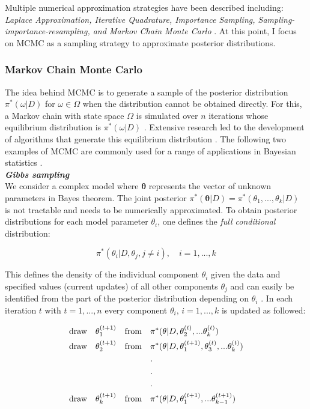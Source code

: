 Multiple numerical approximation strategies have been described including: \emph{Laplace Approximation, Iterative Quadrature, Importance Sampling, Sampling-importance-resampling, and Markov Chain Monte Carlo} \citep{Bernardo2000}. At this point, I focus on \gls{MCMC} \citep{Metropolis1953, Hastings1970} as a sampling strategy to approximate posterior distributions.

\subsubsection{Markov Chain Monte Carlo}

The idea behind MCMC is to generate a sample of the posterior distribution $\pi^*(\omega|D)$ for $\omega\in\Omega$ when the distribution cannot be obtained directly. For this, a Markov chain with state space $\Omega$ is simulated over $n$ iterations whose equilibrium distribution is $\pi^*(\omega|D)$ \citep{Bernardo2000}. Extensive research led to the development of algorithms that generate this equilibrium distribution \citep{Casella1992, Gelfand1990, Greyer1992, Besag1993, Gelman1992}.
The following two examples of MCMC are commonly used for a range of applications in Bayesian statistics \citep{Bernardo2000}.\\

\textbf{\textit{Gibbs sampling}}\\

We consider a complex model where $\bm{\theta}$ represents the vector of unknown parameters in Bayes theorem. The joint posterior $\pi^*(\bm{\theta}|D)=\pi^*(\theta_1,...,\theta_k|D)$ is not tractable and needs to be numerically approximated. To obtain posterior distributions for each model parameter $\theta_i$, one defines the \emph{full conditional} distribution:

\begin{equation}
\pi^*(\theta_i|D,\theta_j,j\neq{}i), \quad i=1,...,k
\end{equation}

This defines the density of the individual component $\theta_i$ given the data and specified values (current updates) of all other components $\theta_j$ \cite{Geman1984} and can easily be identified from the part of the posterior distribution depending on $\theta_i$ \citep{Bernardo2000}. In each iteration $t$ with $t=1,...,n$ every component $\theta_i,\,{}i=1,...,k$ is updated as followed:

\begin{align*}
\textnormal{draw} \quad  \theta_1^{(t+1)} \quad \textnormal{from} \quad & \pi^*(\theta|D, \theta_2^{(t)},...\theta_k^{(t)})\\
\textnormal{draw} \quad  \theta_2^{(t+1)} \quad \textnormal{from} \quad & \pi^*(\theta|D, \theta_1^{(t+1)},\theta_3^{(t)},...\theta_k^{(t)})\\
&.\\
&.\\
&.\\
\textnormal{draw} \quad  \theta_k^{(t+1)} \quad \textnormal{from}  \quad& \pi^*(\theta|D, \theta_1^{(t+1)},...\theta_{k-1}^{(t+1)})
\end{align*}

